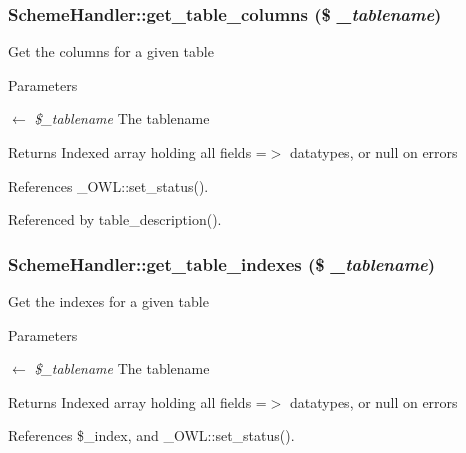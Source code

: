 \subsubsection[{get\_\-table\_\-columns}]{\setlength{\rightskip}{0pt plus 5cm}SchemeHandler::get\_\-table\_\-columns (\$ {\em \_\-tablename})}\label{classSchemeHandler_ab8f222514c3aa614190201a6a8a9cedd}
Get the columns for a given table


\begin{DoxyParams}{Parameters}
\item[\mbox{$\leftarrow$} {\em \$\_\-tablename}]The tablename \end{DoxyParams}
\begin{DoxyReturn}{Returns}
Indexed array holding all fields =$>$ datatypes, or null on errors 
\end{DoxyReturn}


References \_\-OWL::set\_\-status().



Referenced by table\_\-description().

\subsubsection[{get\_\-table\_\-indexes}]{\setlength{\rightskip}{0pt plus 5cm}SchemeHandler::get\_\-table\_\-indexes (\$ {\em \_\-tablename})}\label{classSchemeHandler_a23070e6253bcd9b0bc343bc582219638}
Get the indexes for a given table


\begin{DoxyParams}{Parameters}
\item[\mbox{$\leftarrow$} {\em \$\_\-tablename}]The tablename \end{DoxyParams}
\begin{DoxyReturn}{Returns}
Indexed array holding all fields =$>$ datatypes, or null on errors 
\end{DoxyReturn}


References \$\_\-index, and \_\-OWL::set\_\-status().



